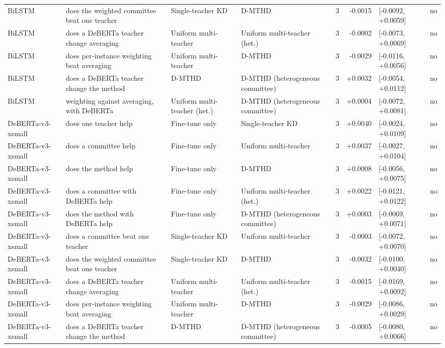 \begin{table}[t]
\begin{tabular}{llllrrll}
BiLSTM & does the weighted committee beat one teacher & Single-teacher KD & D-MTHD & 3 & -0.0015 & [-0.0092, +0.0059] & no \\
BiLSTM & does a DeBERTa teacher change averaging & Uniform multi-teacher & Uniform multi-teacher (het.) & 3 & -0.0002 & [-0.0073, +0.0069] & no \\
BiLSTM & does per-instance weighting beat averaging & Uniform multi-teacher & D-MTHD & 3 & -0.0029 & [-0.0116, +0.0056] & no \\
BiLSTM & does a DeBERTa teacher change the method & D-MTHD & D-MTHD (heterogeneous committee) & 3 & +0.0032 & [-0.0054, +0.0112] & no \\
BiLSTM & weighting against averaging, with DeBERTa & Uniform multi-teacher (het.) & D-MTHD (heterogeneous committee) & 3 & +0.0004 & [-0.0072, +0.0081] & no \\
DeBERTa-v3-xsmall & does one teacher help & Fine-tune only & Single-teacher KD & 3 & +0.0040 & [-0.0024, +0.0109] & no \\
DeBERTa-v3-xsmall & does a committee help & Fine-tune only & Uniform multi-teacher & 3 & +0.0037 & [-0.0027, +0.0104] & no \\
DeBERTa-v3-xsmall & does the method help & Fine-tune only & D-MTHD & 3 & +0.0008 & [-0.0056, +0.0075] & no \\
DeBERTa-v3-xsmall & does a committee with DeBERTa help & Fine-tune only & Uniform multi-teacher (het.) & 3 & +0.0022 & [-0.0121, +0.0122] & no \\
DeBERTa-v3-xsmall & does the method with DeBERTa help & Fine-tune only & D-MTHD (heterogeneous committee) & 3 & +0.0003 & [-0.0069, +0.0071] & no \\
DeBERTa-v3-xsmall & does a committee beat one teacher & Single-teacher KD & Uniform multi-teacher & 3 & -0.0003 & [-0.0072, +0.0070] & no \\
DeBERTa-v3-xsmall & does the weighted committee beat one teacher & Single-teacher KD & D-MTHD & 3 & -0.0032 & [-0.0100, +0.0040] & no \\
DeBERTa-v3-xsmall & does a DeBERTa teacher change averaging & Uniform multi-teacher & Uniform multi-teacher (het.) & 3 & -0.0015 & [-0.0169, +0.0092] & no \\
DeBERTa-v3-xsmall & does per-instance weighting beat averaging & Uniform multi-teacher & D-MTHD & 3 & -0.0029 & [-0.0086, +0.0029] & no \\
DeBERTa-v3-xsmall & does a DeBERTa teacher change the method & D-MTHD & D-MTHD (heterogeneous committee) & 3 & -0.0005 & [-0.0080, +0.0066] & no \\

\end{tabular}
\end{table}
